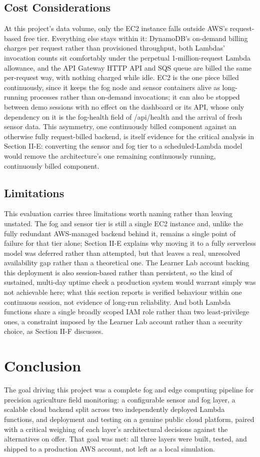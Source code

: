 \documentclass[conference]{IEEEtran}
\begin{document}
\subsection{Cost Considerations}
At this project's data volume, only the EC2 instance falls outside AWS's request-based free tier. Everything else stays within it: DynamoDB's on-demand billing charges per request rather than provisioned throughput, both Lambdas' invocation counts sit comfortably under the perpetual 1-million-request Lambda allowance, and the API Gateway HTTP API and SQS queue are billed the same per-request way, with nothing charged while idle. EC2 is the one piece billed continuously, since it keeps the fog node and sensor containers alive as long-running processes rather than on-demand invocations; it can also be stopped between demo sessions with no effect on the dashboard or its API, whose only dependency on it is the fog-health field of /api/health and the arrival of fresh sensor data. This asymmetry, one continuously billed component against an otherwise fully request-billed backend, is itself evidence for the critical analysis in Section II-E: converting the sensor and fog tier to a scheduled-Lambda model would remove the architecture's one remaining continuously running, continuously billed component.

\subsection{Limitations}
This evaluation carries three limitations worth naming rather than leaving unstated. The fog and sensor tier is still a single EC2 instance and, unlike the fully redundant AWS-managed backend behind it, remains a single point of failure for that tier alone; Section II-E explains why moving it to a fully serverless model was deferred rather than attempted, but that leaves a real, unresolved availability gap rather than a theoretical one. The Learner Lab account backing this deployment is also session-based rather than persistent, so the kind of sustained, multi-day uptime check a production system would warrant simply was not achievable here; what this section reports is verified behaviour within one continuous session, not evidence of long-run reliability. And both Lambda functions share a single broadly scoped IAM role rather than two least-privilege ones, a constraint imposed by the Learner Lab account rather than a security choice, as Section II-F discusses.

\section{Conclusion}
The goal driving this project was a complete fog and edge computing pipeline for precision agriculture field monitoring: a configurable sensor and fog layer, a scalable cloud backend split across two independently deployed Lambda functions, and deployment and testing on a genuine public cloud platform, paired with a critical weighing of each layer's architectural decisions against the alternatives on offer. That goal was met: all three layers were built, tested, and shipped to a production AWS account, not left as a local simulation.
\end{document}

